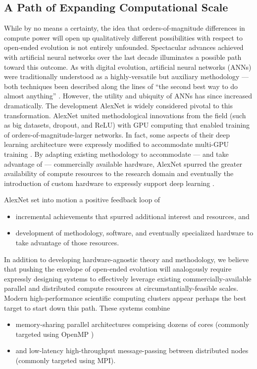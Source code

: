 \subsection{A Path of Expanding Computational Scale}


While by no means a certainty, the idea that orders-of-magnitude differences in compute power will open up qualitatively different possibilities with respect to open-ended evolution is not entirely unfounded.
Spectacular advances achieved with artificial neural networks over the last decade illuminates a possible path toward this outcome.
As with digital evolution, artificial neural networks (ANNs) were traditionally understood as a highly-versatile but auxiliary methodology --- both techniques been described along the lines of ``the second best way to do almost anything'' \citep{miaoulis2008intelligent, eiben2015introduction}.
However, the utility and ubiquity of ANNs has since increased dramatically.
The development AlexNet is widely considered pivotal to this transformation.
AlexNet united methodological innovations from the field (such as big datasets, dropout, and ReLU) with GPU computing that enabled training of orders-of-magnitude-larger networks.
In fact, some aspects of their deep learning architecture were expressly modified to accommodate multi-GPU training \citep{krizhevsky2012imagenet}.
By adapting existing methodology to accommodate --- and take advantage of --- commercially available hardware, AlexNet spurred the greater availability of compute resources to the research domain and eventually the introduction of custom hardware to expressly support deep learning \citep{jouppi2017datacenter}.

AlexNet set into motion a positive feedback loop of
\begin{itemize}
\item incremental achievements that spurred additional interest and resources, and
\item development of methodology, software, and eventually specialized hardware to take advantage of those resources.
\end{itemize}
In addition to developing hardware-agnostic theory and methodology, we believe that pushing the envelope of open-ended evolution will analogously require expressly designing systems to effectively leverage existing commercially-available parallel and distributed compute resources at circumstantially-feasible scales.
Modern high-performance scientific computing clusters appear perhaps the best target to start down this path.
These systems combine
\begin{itemize}
\item memory-sharing parallel architectures comprising dozens of cores (commonly targeted using OpenMP \citep{dagum1998openmp})
\item and low-latency high-throughput message-passing between distributed nodes (commonly targeted using MPI\citep{clarke1994mpi}).
\end{itemize}

